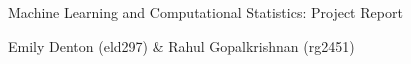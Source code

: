 \documentclass[11pt]{article}
\begin{document}
\vspace*{6cm}

\centerline{\sc \Large Machine Learning and Computational Statistics: Project Report}

\vspace{7cm}

\centerline{\sc Emily Denton (eld297)  \& Rahul Gopalkrishnan (rg2451)}
         
\clearpage 







\nocite{*}


\end{document}
